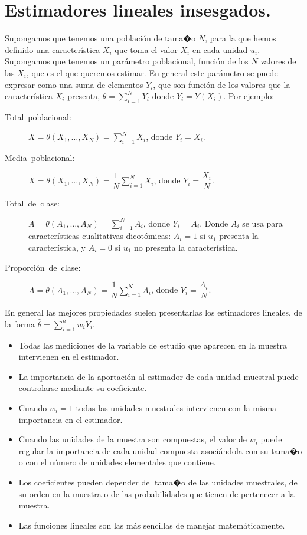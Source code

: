 \section{Estimadores lineales insesgados.}

Supongamos que tenemos una poblaci\'on de tama�o $N$, para la que hemos
definido una caracter\'istica $X_{i}$ que toma el valor $X_{i}$ en
cada unidad $u_{i}$. Supongamos que tenemos un par\'ametro poblacional,
funci\'on de los $N$ valores de las $X_{i}$, que es el que queremos
estimar. En general este par\'ametro se puede expresar como una suma
de elementos $Y_{i}$, que son funci\'on de los valores que la caracter\'istica
$X_{i}$ presenta, $\theta=\sum_{i=1}^{N}Y_{i}$ donde $Y_{i}=Y\left(X_{i}\right)$.
Por ejemplo:
\begin{description}
\item [{Total~poblacional:}] $X=\theta\left(X_{1},\ldots,X_{N}\right)=\sum_{i=1}^{N}X_{i}$,
donde $Y_{i}=X_{i}$.
\item [{Media~poblacional:}] $X=\theta\left(X_{1},\ldots,X_{N}\right)=\dfrac{1}{N}\sum_{i=1}^{N}X_{i}$,
donde $Y_{i}=\dfrac{X_{i}}{N}$.
\item [{Total~de~clase:}] $A=\theta\left(A_{1},\ldots,A_{N}\right)=\sum_{i=1}^{N}A_{i}$,
donde $Y_{i}=A_{i}$. Donde $A_{i}$ se usa para caracter\'isticas cualitativas
dicot\'omicas: $A_{i}=1$ si $u_{1}$ presenta la caracter\'istica, y
$A_{i}=0$ si $u_{1}$ no presenta la caracter\'istica.
\item [{Proporci\'on~de~clase:}] $A=\theta\left(A_{1},\ldots,A_{N}\right)=\dfrac{1}{N}\sum_{i=1}^{N}A_{i}$,
donde $Y_{i}=\dfrac{A_{i}}{N}$.
\end{description}
En general las mejores propiedades suelen presentarlas los estimadores
lineales, de la forma $\hat{\theta}=\sum_{i=1}^{n}w_{i}Y_{i}$.
\begin{itemize}
\item Todas las mediciones de la variable de estudio que aparecen en la
muestra intervienen en el estimador.
\item La importancia de la aportaci\'on al estimador de cada unidad muestral
puede controlarse mediante su coeficiente.
\item Cuando $w_{i}=1$ todas las unidades muestrales intervienen con la
misma importancia en el estimador.
\item Cuando las unidades de la muestra son compuestas, el valor de $w_{i}$
puede regular la importancia de cada unidad compuesta asoci\'andola
con su tama�o o con el n\'umero de unidades elementales que contiene.
\item Los coeficientes pueden depender del tama�o de las unidades muestrales,
de su orden en la muestra o de las probabilidades que tienen de pertenecer
a la muestra.
\item Las funciones lineales son las m\'as sencillas de manejar matem\'aticamente.
\end{itemize}

